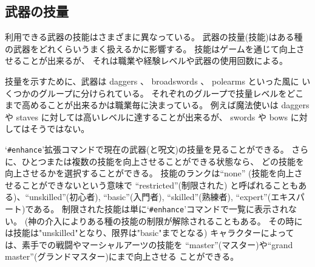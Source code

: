 \subsection*{武器の技量}

利用できる武器の技能はさまざまに異なっている。
武器の技量(技能)はある種の武器をどれくらいうまく扱えるかに影響する。
技能はゲームを通じて向上させることが出来るが、
それは職業や経験レベルや武器の使用回数による。

技量を示すために、武器は daggers 、 broadswords 、 polearms といった風に
いくつかのグループに分けられている。
それぞれのグループで技量レベルをどこまで高めることが出来るかは職業毎に決まっている。
例えば魔法使いは daggers や staves に対しては高いレベルに達することが出来るが、
swords や bows に対してはそうではない。

`{\tt \#enhance}'拡張コマンドで現在の武器(と呪文)の技量を見ることができる。
さらに、ひとつまたは複数の技能を向上させることができる状態なら、
どの技能を向上させるかを選択することができる。
技能のランクは``none'' (技能を向上させることができないという意味で
``restricted''(制限された) と呼ばれることもある)、``unskilled''(初心者),
``basic''(入門者), ``skilled''(熟練者), ``expert''(エキスパート)である。
制限された技能は単に`{\tt \#enhance}'コマンドで一覧に表示されない。
(神の介入によりある種の技能の制限が解除されることもある。
その時には技能は"unskilled"となり、限界は"basic"までとなる)
キャラクターによっては、素手での戦闘やマーシャルアーツの技能を
``master''(マスター)や``grand master''(グランドマスター)にまで向上させる
ことができる。

